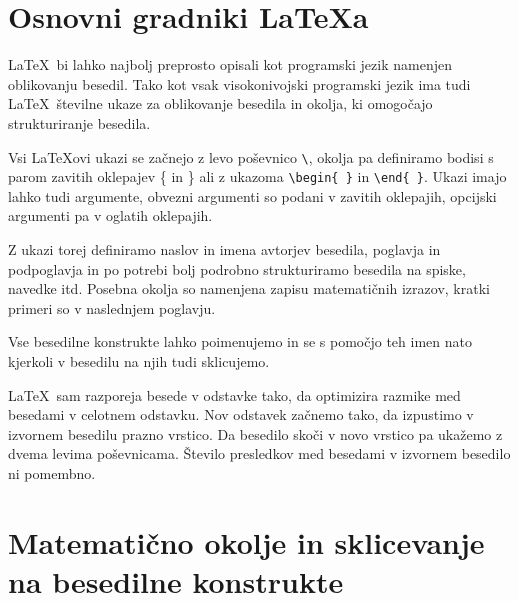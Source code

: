 \documentclass[a4paper, 12pt]{book}
\begin{document}
\chapter{Osnovni gradniki \LaTeX{a}}
\label{ch0}

\LaTeX\ bi lahko najbolj preprosto opisali kot programski jezik namenjen oblikovanju besedil.
Tako kot vsak visokonivojski programski jezik ima tudi \LaTeX\  številne ukaze za oblikovanje  besedila in okolja, ki omogočajo strukturiranje besedila.

Vsi \LaTeX ovi ukazi se začnejo z levo poševnico  \verb=\=, okolja pa definiramo bodisi s parom zavitih oklepajev \{ in \} ali z ukazoma \verb=\begin{ }= in   \verb=\end{ }=.
Ukazi imajo lahko tudi argumente, obvezni argumenti so podani v zavitih oklepajih, opcijski argumenti pa v oglatih oklepajih.

Z ukazi torej definiramo naslov in imena avtorjev besedila, poglavja in podpoglavja in po potrebi bolj podrobno strukturiramo besedila na spiske, navedke itd.
Posebna okolja so namenjena zapisu matematičnih izrazov, kratki primeri so v naslednjem poglavju.

Vse besedilne konstrukte lahko poimenujemo in se s pomočjo teh imen nato  kjerkoli v besedilu na njih  tudi sklicujemo.

\LaTeX\ sam razporeja besede v odstavke tako, da optimizira razmike med besedami v celotnem odstavku.
Nov odstavek začnemo tako, da izpustimo v izvornem besedilu prazno vrstico. Da besedilo skoči v novo vrstico pa ukažemo z dvema levima poševnicama.
Število presledkov med besedami v izvornem besedilo ni pomembno.


\chapter{Matematično okolje in sklicevanje na besedilne konstrukte}
\label{ch1}
\end{document}

